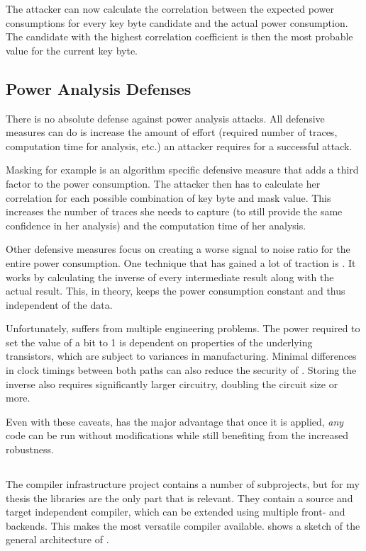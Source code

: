 The attacker can now calculate the correlation between the expected power consumptions for every key byte candidate and the actual power consumption.
The candidate with the highest correlation coefficient is then the most probable value for the current key byte.

\subsection{Power Analysis Defenses}
There is no absolute defense against power analysis attacks.
All defensive measures can do is increase the amount of effort (required number of traces, computation time for analysis, etc.) an attacker requires for a successful attack.

Masking for example is an algorithm specific defensive measure that adds a third factor to the power consumption.
The attacker then has to calculate her correlation for each possible combination of key byte and mask value.
This increases the number of traces she needs to capture (to still provide the same confidence in her analysis) and the computation time of her analysis.

Other defensive measures focus on creating a worse signal to noise ratio for the entire power consumption.
One technique that has gained a lot of traction is \dual{}\cite{sokolov2005design}.
It works by calculating the inverse of every intermediate result along with the actual result.
This, in theory, keeps the power consumption constant and thus independent of the data.

Unfortunately, \dual{} suffers from multiple engineering problems.
The power required to set the value of a bit to 1 is dependent on properties of the underlying transistors, which are subject to variances in manufacturing.\cite{razafindraibe2006formal}
Minimal differences in clock timings between both paths can also reduce the security of \dual{}\cite{baddam2008path}.
Storing the inverse also requires significantly larger circuitry, doubling the circuit size or more\cite{baddam2008path}.

Even with these caveats, \dual{} has the major advantage that once it is applied, \emph{any} code can be run without modifications while still benefiting from the increased robustness.

\subsection{\llvm{}}
\label{llvm}
The \llvm{} compiler infrastructure project\cite{lattner2010llvm} contains a number of subprojects, but for my thesis the \lc{} libraries are the only part that is relevant.
They contain a source and target independent compiler, which can be extended using multiple front- and backends.
This makes \llvm{} the most versatile compiler available.
 shows a sketch of the general architecture of \llvm{}.

